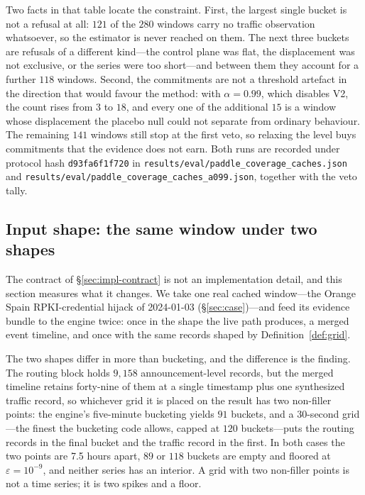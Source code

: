 Two facts in that table locate the constraint. First, the largest single
bucket is not a refusal at all: $121$ of the $280$ windows carry no traffic
observation whatsoever, so the estimator is never reached on them. The next
three buckets are refusals of a different kind---the control plane was flat,
the displacement was not exclusive, or the series were too short---and
between them they account for a further $118$ windows. Second, the
commitments are not a threshold artefact in the direction that would favour
the method: with $\alpha=0.99$, which disables V2, the count rises from $3$
to $18$, and every one of the additional $15$ is a window whose displacement
the placebo null could not separate from ordinary behaviour. The remaining
$141$ windows still stop at the first veto, so relaxing the level buys
commitments that the evidence does not earn. Both runs are recorded under
protocol hash \texttt{d93fa6f1f720} in
\texttt{results/eval/paddle\_coverage\_caches.json} and
\texttt{results/eval/paddle\_coverage\_caches\_a099.json}, together with the
veto tally.

\subsection{Input shape: the same window under two shapes}
\label{sec:eval-shape}

The contract of \S\ref{sec:impl-contract} is not an implementation detail,
and this section measures what it changes. We take one real cached
window---the Orange Spain RPKI-credential hijack of 2024-01-03
(\S\ref{sec:case})---and feed its evidence bundle to the engine twice:
once in the shape the live path produces, a merged event timeline, and once
with the same records shaped by Definition~\ref{def:grid}.

The two shapes differ in more than bucketing, and the difference is the
finding. The routing block holds $9{,}158$ announcement-level records, but
the merged timeline retains forty-nine of them at a single timestamp plus
one synthesized traffic record, so whichever grid it is placed on the
result has two non-filler points: the engine's five-minute bucketing yields
$91$ buckets, and a $30$-second grid---the finest the bucketing code
allows, capped at $120$ buckets---puts the routing records in the final
bucket and the traffic record in the first. In both cases the two points
are 7.5 hours apart, $89$ or $118$ buckets are empty and floored at
$\varepsilon=10^{-9}$, and neither series has an interior. A grid with two
non-filler points is not a time series; it is two spikes and a floor.

